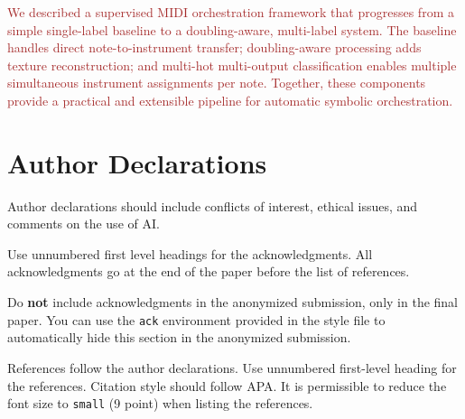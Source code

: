 \documentclass{aimc2026}
\newcommand{\draft}[1]{\textcolor{brown}{#1}}
\begin{document}
\draft{
We described a supervised MIDI orchestration framework that progresses from a simple single-label baseline to a doubling-aware, multi-label system. The baseline handles direct note-to-instrument transfer; doubling-aware processing adds texture reconstruction; and multi-hot multi-output classification enables multiple simultaneous instrument assignments per note. Together, these components provide a practical and extensible pipeline for automatic symbolic orchestration.
}

\section*{Author Declarations}

Author declarations should include conflicts of interest, ethical issues, and comments on the use of AI.

Use unnumbered first level headings for the acknowledgments.
All acknowledgments go at the end of the paper before the list of references.

Do {\bf not} include acknowledgments in the anonymized submission, only in the final paper. You can use the \texttt{ack} environment provided in the style file to automatically hide this section in the anonymized submission.





References follow the author declarations. Use unnumbered first-level heading for the references. Citation style should follow APA. It is permissible to reduce the font size to \texttt{small} (9 point) when listing the references.
\end{document}
